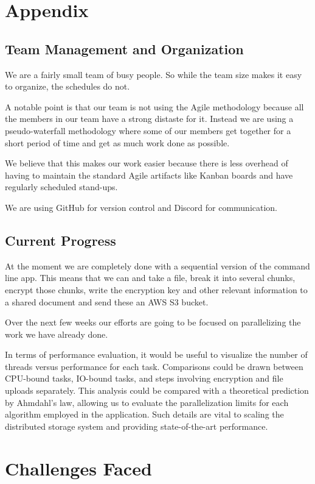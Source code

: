 \documentclass[conference]{IEEEtran}
\begin{document}
\section{Appendix}
\subsection{Team Management and Organization}
We are a fairly small team of busy people.
So while the team size makes it easy to organize, the schedules do not.

A notable point is that our team is not using the Agile methodology because
all the members in our team have a strong distaste for it.
Instead we are using a pseudo-waterfall methodology where some of our members get together
for a short period of time and get as much work done as possible.

We believe that this makes our work easier because there is less overhead of having
to maintain the standard Agile artifacts like Kanban boards and have regularly scheduled stand-ups.

We are using GitHub for version control and Discord for communication.

\subsection{Current Progress}

At the moment we are completely done with a sequential version of the command line app.
This means that we can and take a file, break it into several chunks, encrypt those chunks,
write the encryption key and other relevant information to a shared document and send these
an AWS S3 bucket.

Over the next few weeks our efforts are going to be focused on parallelizing the work we have
already done.

In terms of performance evaluation, it would be useful to visualize the number of threads 
versus performance for each task. Comparisons could be drawn between CPU-bound tasks, IO-bound tasks,
and steps involving encryption and file uploads separately. This analysis could be compared with a 
theoretical prediction by Ahmdahl's law, allowing us to evaluate the parallelization limits for each
algorithm employed in the application. Such details are vital to scaling the distributed storage 
system and providing state-of-the-art performance.

\section{Challenges Faced}
\end{document}
